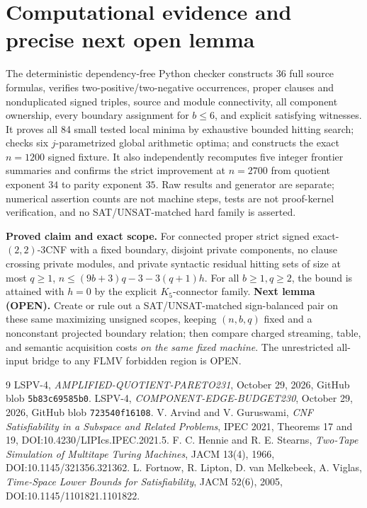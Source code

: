 \documentclass[11pt]{article}
\begin{document}
\section{Computational evidence and precise next open lemma}
The deterministic dependency-free Python checker constructs 36 full source formulas, verifies two-positive/two-negative occurrences, proper clauses and nonduplicated signed triples, source and module connectivity, all component ownership, every boundary assignment for $b\le6$, and explicit satisfying witnesses. It proves all 84 small tested local minima by exhaustive bounded hitting search; checks six $j$-parametrized global arithmetic optima; and constructs the exact $n=1200$ signed fixture. It also independently recomputes five integer frontier summaries and confirms the strict improvement at $n=2700$ from quotient exponent $34$ to parity exponent $35$. Raw results and generator are separate; numerical assertion counts are not machine steps, tests are not proof-kernel verification, and no SAT/UNSAT-matched hard family is asserted.

\noindent\textbf{Proved claim and exact scope.} For connected proper strict signed exact-$(2,2)$-3CNF with a fixed boundary, disjoint private components, no clause crossing private modules, and private syntactic residual hitting sets of size at most $q\ge1$, $n\le(9b+3)q-3-3(q+1)h$. For all $b\ge1,q\ge2$, the bound is attained with $h=0$ by the explicit $K_5$-connector family. \textbf{Next lemma (OPEN).} Create or rule out a SAT/UNSAT-matched sign-balanced pair on these same maximizing unsigned scopes, keeping $(n,b,q)$ fixed and a nonconstant projected boundary relation; then compare charged streaming, table, and semantic acquisition costs \emph{on the same fixed machine}. The unrestricted all-input bridge to any FLMV forbidden region is OPEN.

\begin{thebibliography}{9}
 LSPV-4, \emph{AMPLIFIED-QUOTIENT-PARETO231}, October 29, 2026, GitHub blob \texttt{5b83c69585b0}.
 LSPV-4, \emph{COMPONENT-EDGE-BUDGET230}, October 29, 2026, GitHub blob \texttt{723540f16108}.
 V. Arvind and V. Guruswami, \emph{CNF Satisfiability in a Subspace and Related Problems}, IPEC 2021, Theorems 17 and 19, DOI:10.4230/LIPIcs.IPEC.2021.5.
 F. C. Hennie and R. E. Stearns, \emph{Two-Tape Simulation of Multitape Turing Machines}, JACM 13(4), 1966, DOI:10.1145/321356.321362.
 L. Fortnow, R. Lipton, D. van Melkebeek, A. Viglas, \emph{Time-Space Lower Bounds for Satisfiability}, JACM 52(6), 2005, DOI:10.1145/1101821.1101822.
\end{thebibliography}
\end{document}
